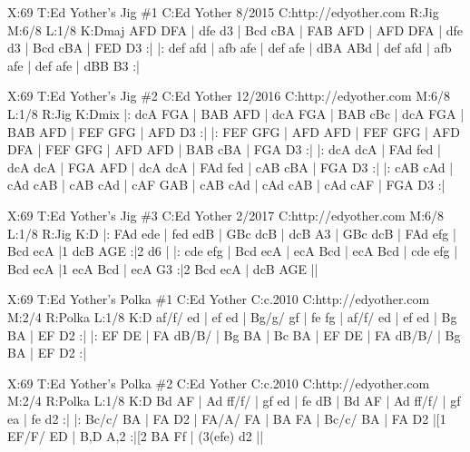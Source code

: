 \documentclass{article}
\begin{document}
\begin{abc}[name]
X:69
T:Ed Yother's Jig \#1
C:Ed Yother 8/2015
C:http://edyother.com
R:Jig
M:6/8
L:1/8
K:Dmaj
AFD DFA | dfe d3 | Bcd cBA | FAB AFD |
AFD DFA | dfe d3 | Bcd cBA | FED D3 :|
|: def afd | afb afe | def afe | dBA ABd |
def afd | afb afe | def afe | dBB B3 :|
\end{abc}

\begin{abc}[name]
X:69
T:Ed Yother's Jig \#2
C:Ed Yother 12/2016
C:http://edyother.com
M:6/8
L:1/8
R:Jig
K:Dmix
|: dcA FGA | BAB AFD | dcA FGA | BAB cBc |
dcA FGA | BAB AFD | FEF GFG | AFD D3 :|
|: FEF GFG | AFD AFD | FEF GFG | AFD DFA |
FEF GFG | AFD AFD | BAB cBA | FGA D3 :|
|: dcA dcA | FAd fed | dcA dcA | FGA AFD |
dcA dcA | FAd fed | cAB cBA | FGA D3 :|
|: cAB cAd | cAd cAB | cAB cAd | cAF GAB |
cAB cAd | cAd cAB | cAd cAF | FGA D3 :|
\end{abc}

\begin{abc}[name]
X:69
T:Ed Yother's Jig \#3
C:Ed Yother 2/2017
C:http://edyother.com
M:6/8
L:1/8
R:Jig
K:D
|: FAd ede | fed edB | GBc dcB | dcB A3 |
GBc dcB | FAd efg | Bcd ecA |1 dcB AGE :|2 d6 |
|: cde efg | Bcd ecA | ecA Bcd | ecA Bcd |
cde efg | Bcd ecA |1 ecA Bcd | ecA G3 :|2  Bcd ecA | dcB AGE ||
\end{abc}

\begin{abc}[name]
X:69
T:Ed Yother's Polka \#1
C:Ed Yother
C:c.2010
C:http://edyother.com
M:2/4
R:Polka
L:1/8
K:D
af/f/ ed | ef ed | Bg/g/ gf | fe fg |
af/f/ ed | ef ed | Bg BA | EF D2 :|
|: EF DE | FA dB/B/ | Bg BA | Bc BA |
EF DE | FA dB/B/ | Bg BA | EF D2 :|
\end{abc}

\begin{abc}[name]
X:69
T:Ed Yother's Polka \#2
C:Ed Yother
C:c.2010
C:http://edyother.com
M:2/4
R:Polka
L:1/8
K:D
Bd AF | Ad ff/f/ | gf ed | fe dB |
Bd AF | Ad ff/f/ | gf ea | fe d2 :|
|: Bc/c/ BA | FA D2 | FA/A/ FA | BA FA |
Bc/c/ BA | FA D2 |[1 EF/F/ ED | B,D A,2 :|[2 BA Ff | (3(efe) d2 ||
\end{abc}
\end{document}
